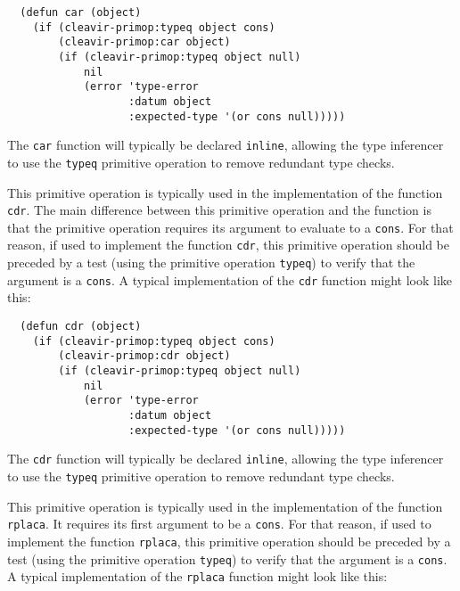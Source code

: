 \begin{verbatim}
  (defun car (object)
    (if (cleavir-primop:typeq object cons)
        (cleavir-primop:car object)
        (if (cleavir-primop:typeq object null)
            nil
            (error 'type-error
                   :datum object
                   :expected-type '(or cons null)))))
\end{verbatim}

The \commonlisp{} \texttt{car} function will typically be declared
\texttt{inline}, allowing the type inferencer
 to use the \texttt{typeq}
primitive operation to remove redundant type checks.


This primitive operation is typically used in the implementation of
the \commonlisp{} function \texttt{cdr}.  The main difference between
this primitive operation and the \commonlisp{} function is that the
primitive operation requires its argument to evaluate to a
\texttt{cons}.  For that reason, if used to implement the
\commonlisp{} function \texttt{cdr}, this primitive operation should
be preceded by a test (using the primitive operation \texttt{typeq})
to verify that the argument is a \texttt{cons}.  A typical
implementation of the \texttt{cdr} function might look like this:

\begin{verbatim}
  (defun cdr (object)
    (if (cleavir-primop:typeq object cons)
        (cleavir-primop:cdr object)
        (if (cleavir-primop:typeq object null)
            nil
            (error 'type-error
                   :datum object
                   :expected-type '(or cons null)))))
\end{verbatim}

The \commonlisp{} \texttt{cdr} function will typically be declared
\texttt{inline}, allowing the type inferencer
 to use the \texttt{typeq}
primitive operation to remove redundant type checks.


This primitive operation is typically used in the implementation of
the \commonlisp{} function \texttt{rplaca}.  It requires its first
argument to be a \texttt{cons}.  For that reason, if used to implement
the \commonlisp{} function \texttt{rplaca}, this primitive operation
should be preceded by a test (using the primitive operation
\texttt{typeq}) to verify that the argument is a \texttt{cons}.  A
typical implementation of the \texttt{rplaca} function might look like
this:

